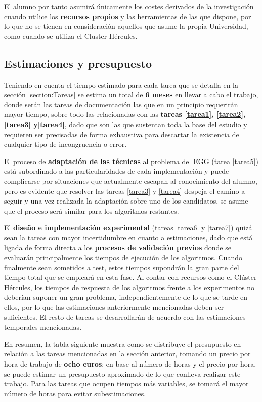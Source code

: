 El alumno por tanto asumirá únicamente los costes derivados de la investigación cuando utilice los \textbf{recursos propios} y las herramientas de las que dispone, por lo que no se tienen en consideración aquellos que asume la propia Universidad, como cuando se utiliza el Cluster Hércules. 
\subsection{Estimaciones y presupuesto}

Teniendo en cuenta el tiempo estimado para cada tarea que se detalla en la sección \ref{section:Tareas} se estima un total de \textbf{6 meses} en llevar a cabo el trabajo, donde serán las tareas de documentación las que en un principio requerirán mayor tiempo, sobre todo las relacionadas con las \textbf{tareas \ref{tarea1}, \ref{tarea2}, \ref{tarea3} y\ref{tarea4}}, dado que son las que sustentan toda la base del estudio y requieren ser precisadas de forma exhaustiva para descartar la existencia de cualquier tipo de incongruencia o error.

El proceso de \textbf{adaptación de las técnicas} al problema del EGG (tarea \ref{tarea5}) está subordinado a las particularidades de cada implementación y puede complicarse por situaciones que actualmente escapan al conocimiento del alumno, pero es evidente que resolver las tareas \ref{tarea3} y \ref{tarea4} despeja el camino a seguir y una vez realizada la adaptación sobre uno de los candidatos, se asume que el proceso será similar para los algoritmos restantes. 

El \textbf{diseño e implementación experimental} (tareas \ref{tarea6} y \ref{tarea7}) quizá sean la tareas con mayor incertidumbre en cuanto a estimaciones, dado que está ligada de forma directa a los \textbf{procesos de validación previos} donde se evaluarán principalmente los tiempos de ejecución de los algoritmos. Cuando finalmente sean sometidos a test, estos tiempos supondrán la gran parte del tiempo total que se empleará en esta fase. Al contar con recursos como el Clúster Hércules, los tiempos de respuesta de los algoritmos frente a los experimentos no deberían suponer un gran problema, independientemente de lo que se tarde en ellos, por lo que las estimaciones anteriormente mencionadas deben ser suficientes. El resto de tareas se desarrollarán de acuerdo con las estimaciones temporales mencionadas.

En resumen, la tabla siguiente muestra como se distribuye el presupuesto en relación a las tareas mencionadas en la sección anterior, tomando un precio por hora de trabajo de \textbf{ocho euros}; en base al número de horas y el precio por hora, se puede estimar un presupuesto aproximado de lo que conlleva realizar este trabajo. Para las tareas que ocupen tiempos más variables, se tomará el mayor número de horas para evitar subestimaciones.

